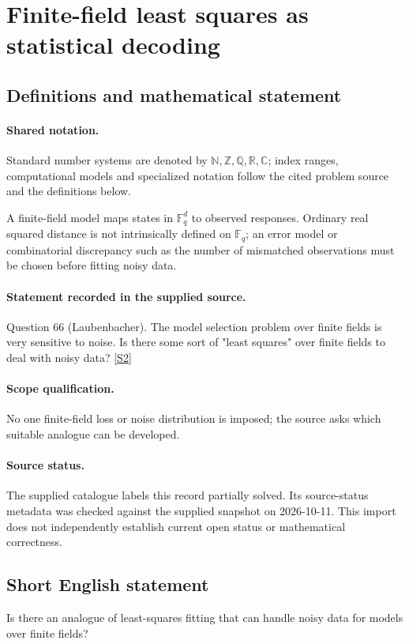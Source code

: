 \documentclass[11pt]{article}
\newcommand{\sref}[2]{\hyperlink{source:#1:#2}{[S#2]}}
\begin{document}
\section{Finite-field least squares as statistical decoding}\label{statement}

\subsection{Definitions and mathematical statement}

\paragraph{Shared notation.}Standard number systems are denoted by $\mathbb N,\mathbb Z,\mathbb Q,\mathbb R,\mathbb C$; index ranges, computational models and specialized notation follow the cited problem source and the definitions below.


A finite-field model maps states in $\mathbb F_q^d$ to observed responses. Ordinary real squared distance is not intrinsically defined on $\mathbb F_q$; an error model or combinatorial discrepancy such as the number of mismatched observations must be chosen before fitting noisy data.
\paragraph{Statement recorded in the supplied source.}
Question 66 (Laubenbacher). The model selection problem over finite fields is very sensitive to noise. Is there some sort of "least squares" over finite fields to deal with noisy data? \sref{statement}{2}
\paragraph{Scope qualification.}
No one finite-field loss or noise distribution is imposed; the source asks which suitable analogue can be developed.
\paragraph{Source status.}
The supplied catalogue labels this record partially solved. Its source-status metadata was checked against the supplied snapshot on 2026-10-11. This import does not independently establish current open status or mathematical correctness.
\subsection{Short English statement}
Is there an analogue of least-squares fitting that can handle noisy data for models over finite fields?
\end{document}
